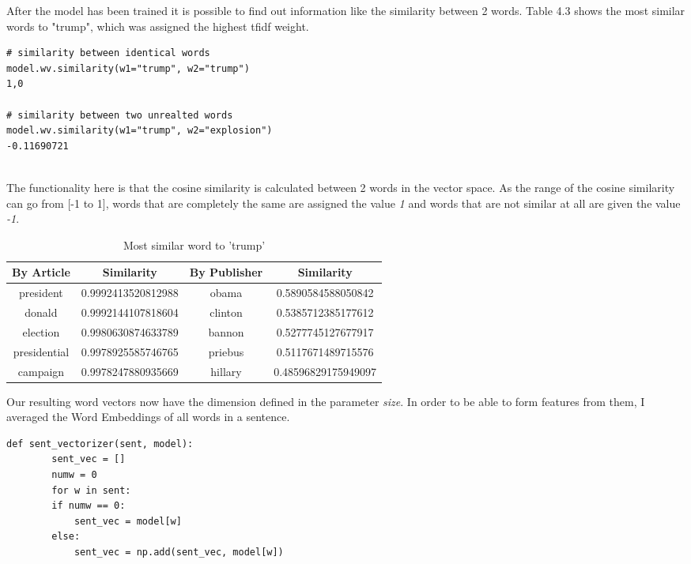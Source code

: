 \documentclass[a4paper, 11pt,titlepage,oneside,openany]{book}
\begin{document}
\noindent 
After the model has been trained it is possible to find out information like the similarity between 2 words. Table 4.3 shows the most similar words to "trump", which was assigned the highest \gls{tfidf} weight. \\
\noindent
\begin{minipage}{\linewidth}
	\begin{lstlisting}
# similarity between identical words
model.wv.similarity(w1="trump", w2="trump")
1,0
	    
# similarity between two unrealted words
model.wv.similarity(w1="trump", w2="explosion")
-0.11690721
	\end{lstlisting}
\end{minipage} \\
\noindent  The functionality here is that the cosine similarity is calculated between 2 words in the vector space. As the range of the cosine similarity can go from [-1 to 1], words that are completely the same are assigned the value \textit{1} and words that are not similar at all are given the value \textit{-1}.
\begin{table}[t]
	\begin{minipage}{.5\textwidth}
		\begin{tabular}{cc|cc}
			\toprule
			By Article & Similarity  & By Publisher & Similarity \\
			\midrule
			president & 0.9992413520812988 & obama & 0.5890584588050842 \\
			donald & 0.9992144107818604 & clinton & 0.5385712385177612 \\
			election & 0.9980630874633789 & bannon & 0.5277745127677917 \\
			presidential & 0.9978925585746765 & priebus & 0.5117671489715576 \\
			campaign & 0.9978247880935669 & hillary &  0.48596829175949097 \\
			\bottomrule
		\end{tabular}
		\caption{Most similar word to 'trump'}
	\end{minipage}
\end{table}
Our resulting word vectors now have the dimension defined in the parameter \textit{size}. In order to be able to form features from them, I averaged the Word Embeddings of all words in a sentence.\\
\noindent
\begin{minipage}{\linewidth}
	\begin{lstlisting}[frame=single]
	def sent_vectorizer(sent, model):
	    sent_vec = []
	    numw = 0
	    for w in sent:
		if numw == 0:
		    sent_vec = model[w]
		else:
		    sent_vec = np.add(sent_vec, model[w])
	\end{lstlisting}
\end{minipage} \\
\end{document}
